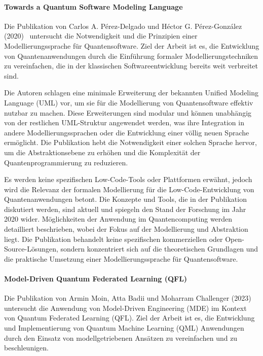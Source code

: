 \paragraph{Towards a Quantum Software Modeling Language}

Die Publikation von Carlos A. Pérez-Delgado und Héctor G. Pérez-González (2020)~\cite{Perez-Delgado_2020} untersucht die Notwendigkeit und die 
Prinzipien einer Modellierungssprache für Quantensoftware. Ziel der Arbeit ist es, die Entwicklung von 
Quantenanwendungen durch die Einführung formaler Modellierungstechniken zu vereinfachen, die in der 
klassischen Softwareentwicklung bereits weit verbreitet sind.

Die Autoren schlagen eine minimale Erweiterung der bekannten Unified Modeling Language (UML) vor, um sie für die 
Modellierung von Quantensoftware effektiv nutzbar zu machen. Diese Erweiterungen sind modular und können unabhängig 
von der restlichen UML-Struktur angewendet werden, was ihre Integration in andere Modellierungssprachen 
oder die Entwicklung einer völlig neuen Sprache ermöglicht. Die Publikation hebt die Notwendigkeit einer solchen Sprache 
hervor, um die Abstraktionsebene zu erhöhen und die Komplexität der Quantenprogrammierung zu reduzieren.

Es werden keine spezifischen Low-Code-Tools oder Plattformen erwähnt, jedoch wird die Relevanz der 
formalen Modellierung für die Low-Code-Entwicklung von Quantenanwendungen betont. 
Die Konzepte und Tools, die in der Publikation diskutiert werden, sind aktuell und spiegeln den Stand der Forschung im Jahr 2020 wider. 
Möglichkeiten der Anwendung im Quantencomputing werden detailliert beschrieben, wobei der Fokus auf der Modellierung 
und Abstraktion liegt. Die Publikation behandelt keine spezifischen kommerziellen oder Open-Source-Lösungen, sondern 
konzentriert sich auf die theoretischen Grundlagen und die praktische Umsetzung einer Modellierungssprache für Quantensoftware.

\paragraph{Model-Driven Quantum Federated Learning (QFL)}

Die Publikation von Armin Moin, Atta Badii und Moharram Challenger (2023)~\cite{Moin_2023} untersucht die Anwendung von 
Model-Driven Engineering (MDE) im Kontext von Quantum Federated Learning (QFL). Ziel der Arbeit ist es, die Entwicklung und 
Implementierung von Quantum Machine Learning (QML) Anwendungen durch den Einsatz von modellgetriebenen Ansätzen zu vereinfachen und zu beschleunigen.

